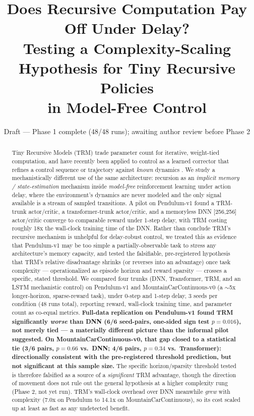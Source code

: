 \documentclass[11pt]{article}
\title{Does Recursive Computation Pay Off Under Delay?\\
Testing a Complexity-Scaling Hypothesis for Tiny Recursive Policies\\
in Model-Free Control}
\author{}
\date{Draft --- Phase 1 complete (48/48 runs); awaiting author review before Phase 2}
\begin{document}
\maketitle

\begin{abstract}
Tiny Recursive Models (TRM) trade parameter count for iterative, weight-tied computation, and have recently been applied to control as a learned corrector that refines a control sequence or trajectory against \emph{known} dynamics \citep{jainlinares2025trc, wijayatunga2026trmpl}. We study a mechanistically different use of the same architecture: recursion as an \emph{implicit memory / state-estimation} mechanism inside \emph{model-free} reinforcement learning under action delay, where the environment's dynamics are never modeled and the only signal available is a stream of sampled transitions. A pilot on Pendulum-v1 found a TRM-trunk actor/critic, a transformer-trunk actor/critic, and a memoryless DNN [256,256] actor/critic converge to comparable reward under 1-step delay, with TRM costing roughly 18x the wall-clock training time of the DNN. Rather than conclude TRM's recursive mechanism is unhelpful for delay-robust control, we treated this as evidence that Pendulum-v1 may be too simple a partially-observable task to stress any architecture's memory capacity, and tested the falsifiable, pre-registered hypothesis that TRM's relative disadvantage shrinks (or reverses into an advantage) once task complexity --- operationalized as episode horizon and reward sparsity --- crosses a specific, stated threshold. We compared four trunks (DNN, Transformer, TRM, and an LSTM mechanistic control) on Pendulum-v1 and MountainCarContinuous-v0 (a $\sim$5x longer-horizon, sparse-reward task), under 0-step and 1-step delay, 3 seeds per condition (48 runs total), reporting reward, wall-clock training time, and parameter count as co-equal metrics. \textbf{Full-data replication on Pendulum-v1 found TRM significantly \emph{worse} than DNN (6/6 seed-pairs, one-sided sign test $p=0.016$), not merely tied --- a materially different picture than the informal pilot suggested. On MountainCarContinuous-v0, that gap closed to a statistical tie (3/6 pairs, $p=0.66$ vs.\ DNN; 4/6 pairs, $p=0.34$ vs.\ Transformer): directionally consistent with the pre-registered threshold prediction, but not significant at this sample size.} The specific horizon/sparsity threshold tested is therefore falsified as a source of a \emph{significant} TRM advantage, though the direction of movement does not rule out the general hypothesis at a higher complexity rung (Phase 2, not yet run). TRM's wall-clock overhead over DNN meanwhile \emph{grew} with complexity (7.0x on Pendulum to 14.1x on MountainCarContinuous), so its cost scaled up at least as fast as any undetected benefit.
\end{abstract}
\end{document}
